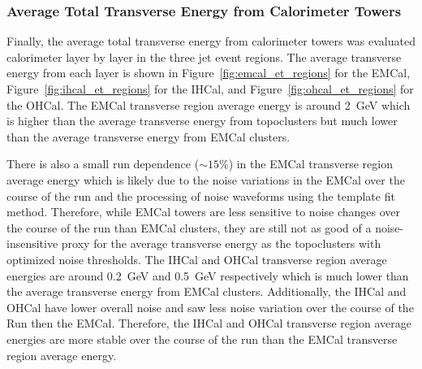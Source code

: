 \subsubsection{Average Total Transverse Energy from Calorimeter Towers}

Finally, the average total transverse energy from calorimeter towers was evaluated calorimeter layer by layer in the three jet event regions.
The average transverse energy from each layer is shown in Figure~\ref{fig:emcal_et_regions} for the EMCal, Figure~\ref{fig:ihcal_et_regions} for the IHCal, and Figure~\ref{fig:ohcal_et_regions} for the OHCal.
The EMCal transverse region average energy is around 2~GeV which is higher than the average transverse energy from topoclusters but much lower than the average transverse energy from EMCal clusters.

There is also a small run dependence ($\sim15\%$) in the EMCal transverse region average energy which is likely due to the noise variations in the EMCal over the course of the run and the processing of noise waveforms using the template fit method.
Therefore, while EMCal towers are less sensitive to noise changes over the course of the run than EMCal clusters, they are still not as good of a noise-insensitive proxy for the average transverse energy as the topoclusters with optimized noise thresholds.
The IHCal and OHCal transverse region average energies are around 0.2~GeV and 0.5~GeV respectively which is much lower than the average transverse energy from EMCal clusters.
Additionally, the IHCal and OHCal have lower overall noise and saw less noise variation over the course of the Run then the EMCal.
Therefore, the IHCal and OHCal transverse region average energies are more stable over the course of the run than the EMCal transverse region average energy.


